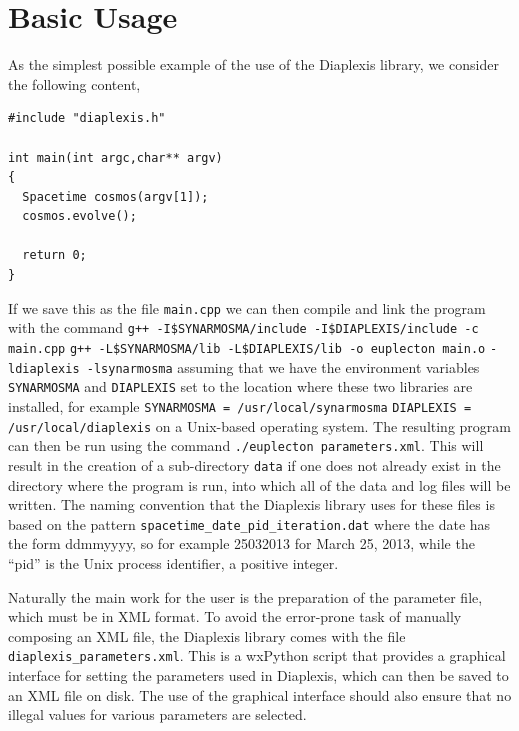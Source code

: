 \documentclass[12pt,letterpaper]{report}
\begin{document}
\section{Basic Usage}

As the simplest possible example of the use of the Diaplexis library, we consider the 
following content,
\begin{verbatim}
#include "diaplexis.h"

int main(int argc,char** argv)
{
  Spacetime cosmos(argv[1]);
  cosmos.evolve();

  return 0;
}
\end{verbatim}
If we save this as the file \texttt{main.cpp} we can then compile and link the program 
with the command
\newline
\texttt{g++ -I\${SYNARMOSMA}/include -I\${DIAPLEXIS}/include -c main.cpp}
\newline
\texttt{g++ -L\${SYNARMOSMA}/lib -L\${DIAPLEXIS}/lib -o euplecton main.o}
\newline
\hspace*{0.5in}\texttt{-ldiaplexis -lsynarmosma}
\newline
assuming that we have the environment variables \texttt{SYNARMOSMA} and \texttt{DIAPLEXIS} set 
to the location where these two libraries are installed, for example 
\newline
\texttt{SYNARMOSMA = /usr/local/synarmosma}
\newline
\texttt{DIAPLEXIS = /usr/local/diaplexis}
\newline
on a Unix-based operating system. The resulting program can then be run using the command 
\texttt{./euplecton parameters.xml}. This will result in the 
creation of a sub-directory \texttt{data} if one does not already exist in the directory where 
the program is run, into which all of the data and log files will be written. The naming 
convention that the Diaplexis library uses for these files is based on the pattern 
\texttt{spacetime\_date\_pid\_iteration.dat} where the date has the form ddmmyyyy, so 
for example 25032013 for March 25, 2013, while the ``pid'' is the Unix process identifier, a 
positive integer. 

Naturally the main work for the user is the preparation of the parameter file, which must 
be in XML format. To avoid the error-prone task of manually composing an XML file, the Diaplexis 
library comes with the file \texttt{diaplexis\_parameters.xml}. This is a wxPython script that 
provides a graphical interface for setting the parameters used in Diaplexis, which can then be 
saved to an XML file on disk. The use of the graphical interface should also ensure that no 
illegal values for various parameters are selected. 
\end{document}

